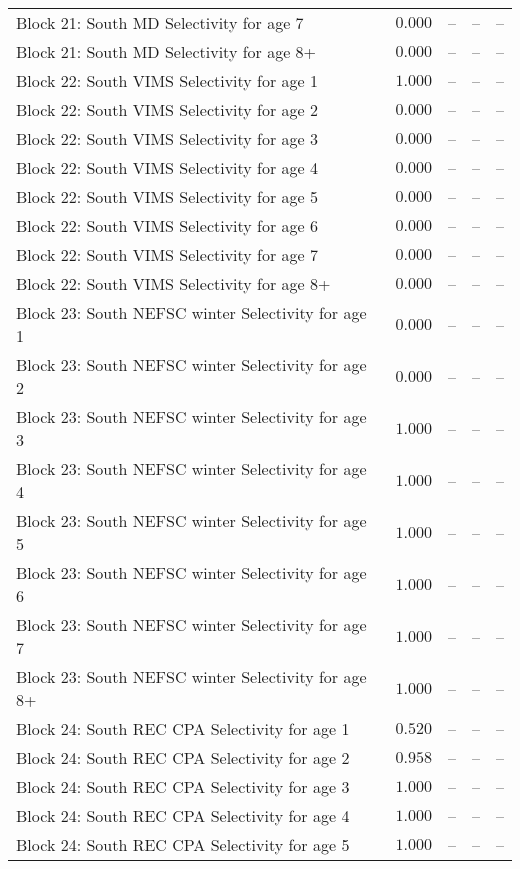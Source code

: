 \documentclass[
]{article}
\begin{document}
\begin{landscape}
\begin{longtable}[t]{lrrrr}
Block 21: South MD Selectivity for age 7 & $0.000$ & -- & -- & --\\
Block 21: South MD Selectivity for age 8+ & $0.000$ & -- & -- & --\\
\addlinespace
Block 22: South VIMS Selectivity for age 1 & $1.000$ & -- & -- & --\\
Block 22: South VIMS Selectivity for age 2 & $0.000$ & -- & -- & --\\
Block 22: South VIMS Selectivity for age 3 & $0.000$ & -- & -- & --\\
Block 22: South VIMS Selectivity for age 4 & $0.000$ & -- & -- & --\\
Block 22: South VIMS Selectivity for age 5 & $0.000$ & -- & -- & --\\
\addlinespace
Block 22: South VIMS Selectivity for age 6 & $0.000$ & -- & -- & --\\
Block 22: South VIMS Selectivity for age 7 & $0.000$ & -- & -- & --\\
Block 22: South VIMS Selectivity for age 8+ & $0.000$ & -- & -- & --\\
Block 23: South NEFSC winter Selectivity for age 1 & $0.000$ & -- & -- & --\\
Block 23: South NEFSC winter Selectivity for age 2 & $0.000$ & -- & -- & --\\
\addlinespace
Block 23: South NEFSC winter Selectivity for age 3 & $1.000$ & -- & -- & --\\
Block 23: South NEFSC winter Selectivity for age 4 & $1.000$ & -- & -- & --\\
Block 23: South NEFSC winter Selectivity for age 5 & $1.000$ & -- & -- & --\\
Block 23: South NEFSC winter Selectivity for age 6 & $1.000$ & -- & -- & --\\
Block 23: South NEFSC winter Selectivity for age 7 & $1.000$ & -- & -- & --\\
\addlinespace
Block 23: South NEFSC winter Selectivity for age 8+ & $1.000$ & -- & -- & --\\
Block 24: South REC CPA Selectivity for age 1 & $0.520$ & -- & -- & --\\
Block 24: South REC CPA Selectivity for age 2 & $0.958$ & -- & -- & --\\
Block 24: South REC CPA Selectivity for age 3 & $1.000$ & -- & -- & --\\
Block 24: South REC CPA Selectivity for age 4 & $1.000$ & -- & -- & --\\
\addlinespace
Block 24: South REC CPA Selectivity for age 5 & $1.000$ & -- & -- & --\\

\end{longtable}
\end{landscape}
\end{document}
